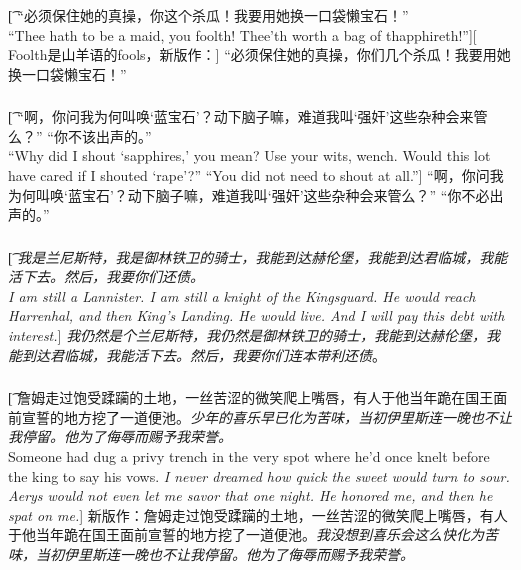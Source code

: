 \documentclass[12pt,a4paper]{article}
\begin{document}
\subsubsection{}\t[
“必须保住她的真操，你这个杀瓜！我要用她换一口袋懒宝石！”\\
“Thee hath to be a maid, you foolth! Thee'th worth a bag of thapphireth!”][
Foolth是山羊语的fools，新版作：]
“必须保住她的真操，你们几个杀瓜！我要用她换一口袋懒宝石！”

\subsubsection{}\t[
“啊，你问我为何叫唤‘蓝宝石’？动下脑子嘛，难道我叫‘强奸’这些杂种会来管么？”
“你不该出声的。”\\
“Why did I shout ‘sapphires,’ you mean? Use your wits, wench. Would this lot have cared if I shouted ‘rape’?”
“You did not need to shout at all.”]
“啊，你问我为何叫唤‘蓝宝石’？动下脑子嘛，难道我叫‘强奸’这些杂种会来管么？”
“你不必出声的。”

\subsubsection{}\t[
\emph{我是兰尼斯特，我是御林铁卫的骑士，我能到达赫伦堡，我能到达君临城，我能活下去。然后，我要你们还债。\\
	I am still a Lannister. I am still a knight of the Kingsguard. He would reach Harrenhal, and then King's Landing. He would live. And I will pay this debt with interest.}]
\emph{我仍然是个兰尼斯特，我仍然是御林铁卫的骑士，我能到达赫伦堡，我能到达君临城，我能活下去。然后，我要你们连本带利还债}。

\subsubsection{}\t[
	詹姆走过饱受蹂躏的土地，一丝苦涩的微笑爬上嘴唇，有人于他当年跪在国王面前宣誓的地方挖了一道便池。\emph{少年的喜乐早已化为苦味，当初伊里斯连一晚也不让我停留。他为了侮辱而赐予我荣誉。}\\
	Someone had dug a privy trench in the very spot where he'd once knelt before the king to say his vows. \emph{I never dreamed how quick the sweet would turn to sour. Aerys would not even let me savor that one night. He honored me, and then he spat on me.}]
	新版作：詹姆走过饱受蹂躏的土地，一丝苦涩的微笑爬上嘴唇，有人于他当年跪在国王面前宣誓的地方挖了一道便池。\emph{我没想到喜乐会这么快化为苦味，当初伊里斯连一晚也不让我停留。他为了侮辱而赐予我荣誉。}
\end{document}
